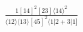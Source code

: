 \documentclass[varwidth, border=5pt]{standalone}
\begin{document}
\begin{my}
$\begin{gathered}
\scriptscriptstyle\frac{1[14]^2[23]⟨14⟩^2}{⟨12⟩⟨13⟩[45]^2⟨1|2+3|1]}
\end{gathered}$
\end{my}
\end{document}
